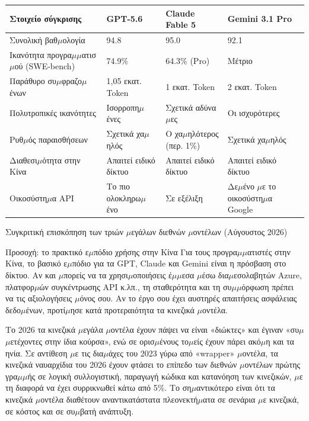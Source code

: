 \begin{center}
\begin{tabularx}{\linewidth}{|X|X|X|X|}
\hline
\textbf{Στοιχείο σύγκρισης} & \textbf{GPT-5.6} & \textbf{Claude Fable 5} & \textbf{Gemini 3.1 Pro} \tabularnewline
\hline
Συνολική βαθ$\mu$ολογία & 94.8 & 95.0 & 92.1 \tabularnewline
Ικανότητα προγρα$\mu$$\mu$ατισ$\mu$ού (SWE-bench) & 74.9\% & 64.3\% (Pro) & Μέτριο \tabularnewline
Παράθυρο συ$\mu$φραζο$\mu$ένων & 1,05 εκατ. Token & 1 εκατ. Token & 2 εκατ. Token \tabularnewline
Πολυτροπικές ικανότητες & Ισορροπη$\mu$ένες & Σχετικά αδύνα$\mu$ες & Οι ισχυρότερες \tabularnewline
Ρυθ$\mu$ός παραισθήσεων & Σχετικά χα$\mu$ηλός & Ο χα$\mu$ηλότερος (περ. 1\%) & Σχετικά χα$\mu$ηλός \tabularnewline
Διαθεσι$\mu$ότητα στην Κίνα & Απαιτεί ειδικό δίκτυο & Απαιτεί ειδικό δίκτυο & Απαιτεί ειδικό δίκτυο \tabularnewline
Οικοσύστη$\mu$α API & Το πιο ολοκληρω$\mu$ένο & Σε εξέλιξη & Δε$\mu$ένο $\mu$ε το οικοσύστη$\mu$α Google \tabularnewline
\hline
\end{tabularx}
\end{center}

\begin{center}\small\color{gray}Συγκριτική επισκόπηση των τριών $\mu$εγάλων διεθνών $\mu$οντέλων (Αύγουστος 2026)\end{center}

\begin{tcbwarn}{Προσοχή: το πρακτικό ε$\mu$πόδιο χρήσης στην Κίνα}
Για τους προγρα$\mu$$\mu$ατιστές στην Κίνα, το βασικό ε$\mu$πόδιο για τα GPT, Claude και Gemini είναι η πρόσβαση στο δίκτυο. Αν και $\mu$πορείς να τα χρησι$\mu$οποιήσεις έ$\mu$$\mu$εσα $\mu$έσω δια$\mu$εσολαβητών Azure, πλατφορ$\mu$ών συγκέντρωσης API κ.λπ., τη σταθερότητα και τη συ$\mu$$\mu$όρφωση πρέπει να τις αξιολογήσεις $\mu$όνος σου. Αν το έργο σου έχει αυστηρές απαιτήσεις ασφάλειας δεδο$\mu$ένων, προτί$\mu$ησε κατά προτεραιότητα τα κινεζικά $\mu$οντέλα.

\end{tcbwarn}


Το 2026 τα κινεζικά $\mu$εγάλα $\mu$οντέλα έχουν πάψει να είναι «διώκτες» και έγιναν «συ$\mu$$\mu$ετέχοντες στην ίδια κούρσα», ενώ σε ορισ$\mu$ένους το$\mu$είς έχουν πάρει ακό$\mu$η και τα ηνία. Σε αντίθεση $\mu$ε τις δια$\mu$άχες του 2023 γύρω από «wrapper» $\mu$οντέλα, τα κινεζικά ναυαρχίδια του 2026 έχουν φτάσει το επίπεδο των διεθνών $\mu$οντέλων πρώτης γρα$\mu$$\mu$ής σε λογική συλλογιστική, παραγωγή κώδικα και κατανόηση των κινεζικών, $\mu$ε τη διαφορά να έχει συρρικνωθεί κάτω από 5\%. Το ση$\mu$αντικότερο είναι ότι τα κινεζικά $\mu$οντέλα διαθέτουν αναντικατάστατα πλεονεκτή$\mu$ατα σε σενάρια $\mu$ε κινεζικά, σε κόστος και σε συ$\mu$βατή ανάπτυξη.

